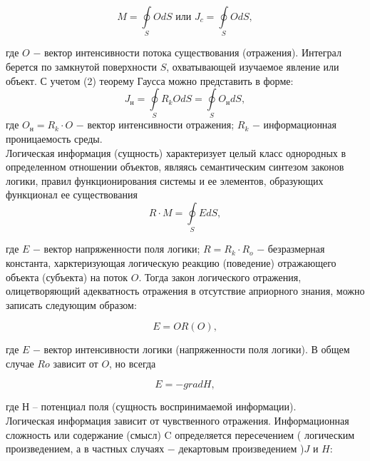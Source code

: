 \documentclass[a4paper,12pt]{report}
\begin{document}
\begin{equation}
\label{trivial}
	M = \oint\limits_{S}O dS \mbox{ или }	   J_c = \oint\limits_{S}O dS ,	      
\end{equation}   							
       	         
где $O$ − вектор интенсивности потока существования (отражения). Интеграл берется по замкнутой поверхности $S$, охватывающей изучаемое явление или объект. С учетом (2) теорему Гаусса можно представить в форме:
\begin{equation}
\label{trivial}
	 J_н = \oint\limits_{S} R_k O dS = \oint\limits_{S} O_н dS, 								
\end{equation} 
где $O_н = R_k \cdot O$ − вектор интенсивности отражения; $R_k$ − информационная проницаемость среды.\\

	Логическая информация (сущность) характеризует целый класс однородных в определенном отношении объектов, являясь семантическим синтезом законов логики, правил функционирования системы и ее элементов, образующих функционал ее существования 
\begin{equation}
\label{trivial}
R \cdot M = \oint\limits_{S} E dS,
\end{equation} 
	 									
где $E$ − вектор напряженности поля логики; $R = R_k \cdot R_o$ − безразмерная константа, харктеризующая логическую реакцию (поведение) отражающего объекта (субъекта) на поток $O$. Тогда закон логического отражения, олицетворяющий адекватность отражения в отсутствие априорного знания, можно записать следующим образом:

	\begin{equation}
\label{trivial}
E = O R(O),
\end{equation} 

где $E$ − вектор интенсивности логики (напряженности поля логики). В общем случае $Ro$ зависит от $O$, но всегда 

	\begin{equation}
\label{trivial}
E  = - grad H,
\end{equation} 

где $Н$ – потенциал поля (сущность воспринимаемой информации).\\

	Логическая информация зависит от чувственного отражения. Информационная сложность или содержание (смысл) C определяется пересечением ( логическим произведением, а в частных случаях − декартовым произведением )$J$ и $H$:
\end{document}
